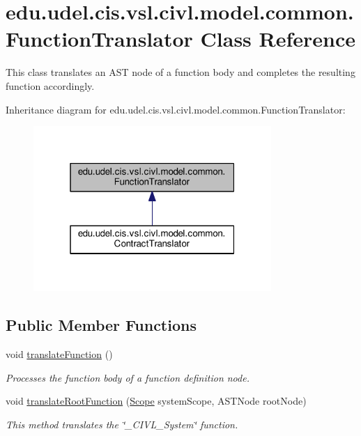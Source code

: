 \hypertarget{classedu_1_1udel_1_1cis_1_1vsl_1_1civl_1_1model_1_1common_1_1FunctionTranslator}{}\section{edu.\+udel.\+cis.\+vsl.\+civl.\+model.\+common.\+Function\+Translator Class Reference}
\label{classedu_1_1udel_1_1cis_1_1vsl_1_1civl_1_1model_1_1common_1_1FunctionTranslator}


This class translates an A\+S\+T node of a function body and completes the resulting function accordingly.  




Inheritance diagram for edu.\+udel.\+cis.\+vsl.\+civl.\+model.\+common.\+Function\+Translator\+:
\nopagebreak
\begin{figure}[H]
\begin{center}
\leavevmode
\includegraphics[width=256pt]{classedu_1_1udel_1_1cis_1_1vsl_1_1civl_1_1model_1_1common_1_1FunctionTranslator__inherit__graph}
\end{center}
\end{figure}
\subsection*{Public Member Functions}
\begin{DoxyCompactItemize}
\item 
void \hyperlink{classedu_1_1udel_1_1cis_1_1vsl_1_1civl_1_1model_1_1common_1_1FunctionTranslator_ab8f7532c64158bab7e7edfc6d317ec2c}{translate\+Function} ()
\begin{DoxyCompactList}\small\item\em Processes the function body of a function definition node. \end{DoxyCompactList}\item 
void \hyperlink{classedu_1_1udel_1_1cis_1_1vsl_1_1civl_1_1model_1_1common_1_1FunctionTranslator_a2cd1ddb2d868c15ee651007290768855}{translate\+Root\+Function} (\hyperlink{interfaceedu_1_1udel_1_1cis_1_1vsl_1_1civl_1_1model_1_1IF_1_1Scope}{Scope} system\+Scope, A\+S\+T\+Node root\+Node)
\begin{DoxyCompactList}\small\item\em This method translates the \char`\"{}\+\_\+\+C\+I\+V\+L\+\_\+\+System\char`\"{} function. \end{DoxyCompactList}\end{DoxyCompactItemize}
